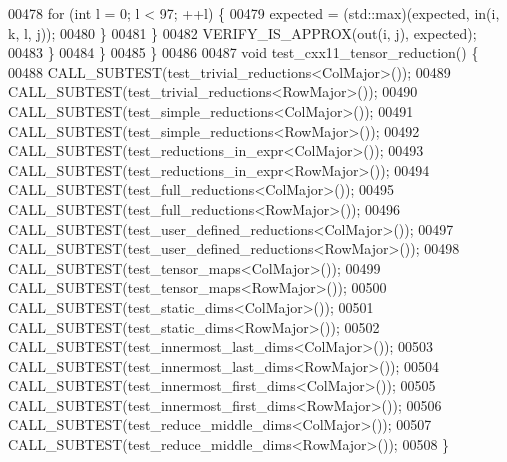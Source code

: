 \begin{DoxyCode}
00478         \textcolor{keywordflow}{for} (\textcolor{keywordtype}{int} l = 0; l < 97; ++l) \{
00479           expected = (std::max)(expected, in(i, k, l, j));
00480         \}
00481       \}
00482       VERIFY\_IS\_APPROX(out(i, j), expected);
00483     \}
00484   \}
00485 \}
00486 
00487 \textcolor{keywordtype}{void} test\_cxx11\_tensor\_reduction() \{
00488   CALL\_SUBTEST(test\_trivial\_reductions<ColMajor>());
00489   CALL\_SUBTEST(test\_trivial\_reductions<RowMajor>());
00490   CALL\_SUBTEST(test\_simple\_reductions<ColMajor>());
00491   CALL\_SUBTEST(test\_simple\_reductions<RowMajor>());
00492   CALL\_SUBTEST(test\_reductions\_in\_expr<ColMajor>());
00493   CALL\_SUBTEST(test\_reductions\_in\_expr<RowMajor>());
00494   CALL\_SUBTEST(test\_full\_reductions<ColMajor>());
00495   CALL\_SUBTEST(test\_full\_reductions<RowMajor>());
00496   CALL\_SUBTEST(test\_user\_defined\_reductions<ColMajor>());
00497   CALL\_SUBTEST(test\_user\_defined\_reductions<RowMajor>());
00498   CALL\_SUBTEST(test\_tensor\_maps<ColMajor>());
00499   CALL\_SUBTEST(test\_tensor\_maps<RowMajor>());
00500   CALL\_SUBTEST(test\_static\_dims<ColMajor>());
00501   CALL\_SUBTEST(test\_static\_dims<RowMajor>());
00502   CALL\_SUBTEST(test\_innermost\_last\_dims<ColMajor>());
00503   CALL\_SUBTEST(test\_innermost\_last\_dims<RowMajor>());
00504   CALL\_SUBTEST(test\_innermost\_first\_dims<ColMajor>());
00505   CALL\_SUBTEST(test\_innermost\_first\_dims<RowMajor>());
00506   CALL\_SUBTEST(test\_reduce\_middle\_dims<ColMajor>());
00507   CALL\_SUBTEST(test\_reduce\_middle\_dims<RowMajor>());
00508 \}
\end{DoxyCode}
